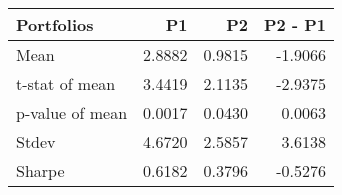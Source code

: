 \begin{tabular}{lrrr}
\toprule
Portfolios & P1 & P2 & P2 - P1 \\
\midrule
Mean & 2.8882 & 0.9815 & -1.9066 \\
t-stat of mean & 3.4419 & 2.1135 & -2.9375 \\
p-value of mean & 0.0017 & 0.0430 & 0.0063 \\
Stdev & 4.6720 & 2.5857 & 3.6138 \\
Sharpe & 0.6182 & 0.3796 & -0.5276 \\
\bottomrule
\end{tabular}
